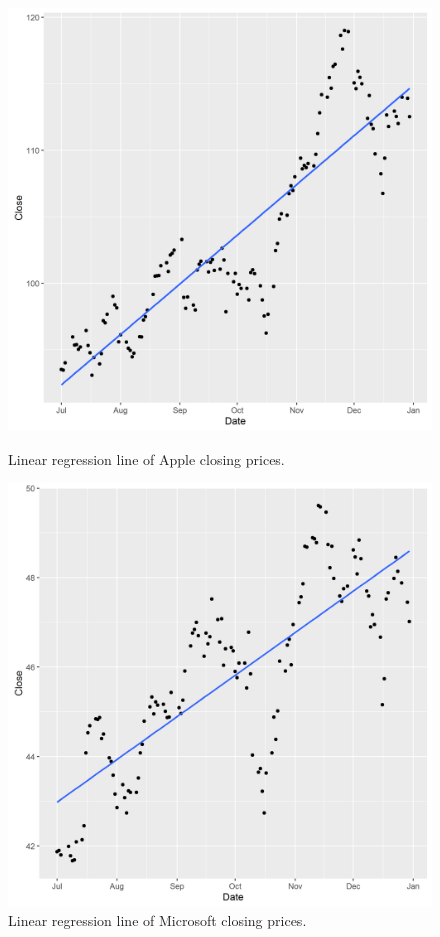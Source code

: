 \documentclass[paper=a4, fontsize=11pt]{scrartcl} %
\numberwithin{equation}{section} %
\numberwithin{figure}{section} %
\numberwithin{table}{section} %
\begin{document}
\begin{figure}[!htb]
  \includegraphics[width=\linewidth]{graph/a_reg8.png}
  \caption{Linear regression line of Apple closing prices.}
\endminipage\hfill
{}
  \includegraphics[width=\linewidth]{graph/m_reg8.png}
  \caption{Linear regression line of Microsoft closing prices.}
\endminipage\hfill
\end{figure}
\end{document}
